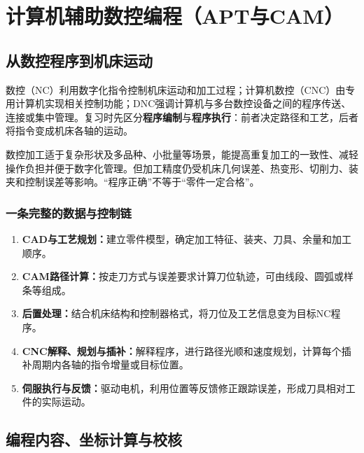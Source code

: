 \chapter{计算机辅助数控编程（APT与CAM）}
\label{ch:nc}

\section{从数控程序到机床运动}
数控（NC）利用数字化指令控制机床运动和加工过程；计算机数控（CNC）由专用计算机实现相关控制功能；DNC强调计算机与多台数控设备之间的程序传送、连接或集中管理。复习时先区分\textbf{程序编制}与\textbf{程序执行}：前者决定路径和工艺，后者将指令变成机床各轴的运动。


数控加工适于复杂形状及多品种、小批量等场景，能提高重复加工的一致性、减轻操作负担并便于数字化管理。但加工精度仍受机床几何误差、热变形、切削力、装夹和控制误差等影响。“程序正确”不等于“零件一定合格”。

\subsection{一条完整的数据与控制链}
\begin{enumerate}
\item \textbf{CAD与工艺规划：}建立零件模型，确定加工特征、装夹、刀具、余量和加工顺序。
\item \textbf{CAM路径计算：}按走刀方式与误差要求计算刀位轨迹，可由线段、圆弧或样条等组成。
\item \textbf{后置处理：}结合机床结构和控制器格式，将刀位及工艺信息变为目标NC程序。
\item \textbf{CNC解释、规划与插补：}解释程序，进行路径光顺和速度规划，计算每个插补周期内各轴的指令增量或目标位置。
\item \textbf{伺服执行与反馈：}驱动电机，利用位置等反馈修正跟踪误差，形成刀具相对工件的实际运动。
\end{enumerate}


\section{编程内容、坐标计算与校核}

